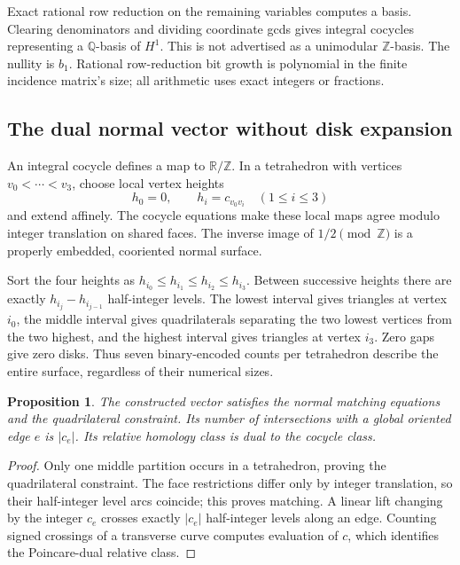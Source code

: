 \documentclass[11pt]{article}
\newtheorem{proposition}[theorem]{Proposition}
\theoremstyle{definition}
\newcommand{\Q}{\mathbb Q}
\newcommand{\Z}{\mathbb Z}
\begin{document}
Exact rational row reduction on the remaining variables computes a basis.
Clearing denominators and dividing coordinate gcds gives integral cocycles
representing a $\Q$-basis of $H^1$. This is not advertised as a unimodular
$\Z$-basis. The nullity is $b_1$. Rational row-reduction bit growth is polynomial
in the finite incidence matrix's size; all arithmetic uses exact integers or
fractions.

\subsection{The dual normal vector without disk expansion}

An integral cocycle defines a map to $\mathbb R/\Z$. In a tetrahedron with
vertices $v_0<\cdots<v_3$, choose local vertex heights
\[
 h_0=0,\qquad h_i=c_{v_0v_i}\quad(1\le i\le3)
\]
and extend affinely. The cocycle equations make these local maps agree modulo
integer translation on shared faces. The inverse image of $1/2\pmod\Z$ is a
properly embedded, cooriented normal surface.

Sort the four heights as
$h_{i_0}\le h_{i_1}\le h_{i_2}\le h_{i_3}$.
Between successive heights there are exactly
$h_{i_j}-h_{i_{j-1}}$ half-integer levels. The lowest interval gives triangles
at vertex $i_0$, the middle interval gives quadrilaterals separating the two
lowest vertices from the two highest, and the highest interval gives triangles
at vertex $i_3$. Zero gaps give zero disks. Thus seven binary-encoded counts per
tetrahedron describe the entire surface, regardless of their numerical sizes.

\begin{proposition}
The constructed vector satisfies the normal matching equations and the
quadrilateral constraint. Its number of intersections with a global oriented
edge $e$ is $|c_e|$. Its relative homology class is dual to the cocycle class.
\end{proposition}
\begin{proof}
Only one middle partition occurs in a tetrahedron, proving the quadrilateral
constraint. The face restrictions differ only by integer translation, so their
half-integer level arcs coincide; this proves matching. A linear lift changing
by the integer $c_e$ crosses exactly $|c_e|$ half-integer levels along an edge.
Counting signed crossings of a transverse curve computes evaluation of $c$,
which identifies the Poincare-dual relative class.
\end{proof}
\end{document}
